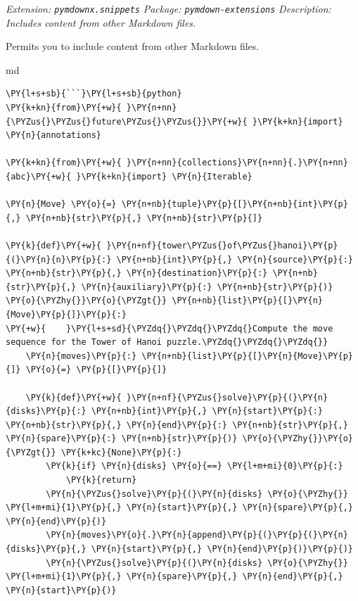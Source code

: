 \documentclass[a4paper,twoside]{article}
\begin{document}
\emph{Extension: \texttt{pymdownx.snippets}}
\emph{Package: \texttt{pymdown-\allowbreak{}extensions}}
\emph{Description: Includes content from other Markdown files.}

Permits you to include content from other Markdown files.

\begin{code}{md}{}{}
\begin{Verbatim}[commandchars=\\\{\},breaklines, breakanywhere, commandchars=\\\{\}]
\PY{l+s+sb}{```}\PY{l+s+sb}{python}
\PY{k+kn}{from}\PY{+w}{ }\PY{n+nn}{\PYZus{}\PYZus{}future\PYZus{}\PYZus{}}\PY{+w}{ }\PY{k+kn}{import} \PY{n}{annotations}

\PY{k+kn}{from}\PY{+w}{ }\PY{n+nn}{collections}\PY{n+nn}{.}\PY{n+nn}{abc}\PY{+w}{ }\PY{k+kn}{import} \PY{n}{Iterable}

\PY{n}{Move} \PY{o}{=} \PY{n+nb}{tuple}\PY{p}{[}\PY{n+nb}{int}\PY{p}{,} \PY{n+nb}{str}\PY{p}{,} \PY{n+nb}{str}\PY{p}{]}

\PY{k}{def}\PY{+w}{ }\PY{n+nf}{tower\PYZus{}of\PYZus{}hanoi}\PY{p}{(}\PY{n}{n}\PY{p}{:} \PY{n+nb}{int}\PY{p}{,} \PY{n}{source}\PY{p}{:} \PY{n+nb}{str}\PY{p}{,} \PY{n}{destination}\PY{p}{:} \PY{n+nb}{str}\PY{p}{,} \PY{n}{auxiliary}\PY{p}{:} \PY{n+nb}{str}\PY{p}{)} \PY{o}{\PYZhy{}}\PY{o}{\PYZgt{}} \PY{n+nb}{list}\PY{p}{[}\PY{n}{Move}\PY{p}{]}\PY{p}{:}
\PY{+w}{    }\PY{l+s+sd}{\PYZdq{}\PYZdq{}\PYZdq{}Compute the move sequence for the Tower of Hanoi puzzle.\PYZdq{}\PYZdq{}\PYZdq{}}
    \PY{n}{moves}\PY{p}{:} \PY{n+nb}{list}\PY{p}{[}\PY{n}{Move}\PY{p}{]} \PY{o}{=} \PY{p}{[}\PY{p}{]}

    \PY{k}{def}\PY{+w}{ }\PY{n+nf}{\PYZus{}solve}\PY{p}{(}\PY{n}{disks}\PY{p}{:} \PY{n+nb}{int}\PY{p}{,} \PY{n}{start}\PY{p}{:} \PY{n+nb}{str}\PY{p}{,} \PY{n}{end}\PY{p}{:} \PY{n+nb}{str}\PY{p}{,} \PY{n}{spare}\PY{p}{:} \PY{n+nb}{str}\PY{p}{)} \PY{o}{\PYZhy{}}\PY{o}{\PYZgt{}} \PY{k+kc}{None}\PY{p}{:}
        \PY{k}{if} \PY{n}{disks} \PY{o}{==} \PY{l+m+mi}{0}\PY{p}{:}
            \PY{k}{return}
        \PY{n}{\PYZus{}solve}\PY{p}{(}\PY{n}{disks} \PY{o}{\PYZhy{}} \PY{l+m+mi}{1}\PY{p}{,} \PY{n}{start}\PY{p}{,} \PY{n}{spare}\PY{p}{,} \PY{n}{end}\PY{p}{)}
        \PY{n}{moves}\PY{o}{.}\PY{n}{append}\PY{p}{(}\PY{p}{(}\PY{n}{disks}\PY{p}{,} \PY{n}{start}\PY{p}{,} \PY{n}{end}\PY{p}{)}\PY{p}{)}
        \PY{n}{\PYZus{}solve}\PY{p}{(}\PY{n}{disks} \PY{o}{\PYZhy{}} \PY{l+m+mi}{1}\PY{p}{,} \PY{n}{spare}\PY{p}{,} \PY{n}{end}\PY{p}{,} \PY{n}{start}\PY{p}{)}


\end{Verbatim}
\end{code}
\end{document}
